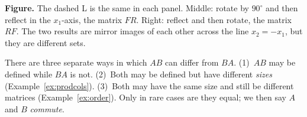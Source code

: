 \documentclass[11pt]{article}
\begin{document}
\begin{center}
\end{center}

\textbf{Figure.} The dashed L is the same in each panel. Middle: rotate by $90^\circ$ and then reflect in the $x_1$-axis, the matrix $FR$. Right: reflect and then rotate, the matrix $RF$. The two results are mirror images of each other across the line $x_2=-x_1$, but they are different sets.

There are three separate ways in which $AB$ can differ from $BA$. (1)~$AB$ may be defined while $BA$ is not. (2)~Both may be defined but have different \emph{sizes} (Example~\ref{ex:prodcols}). (3)~Both may have the same size and still be different matrices (Example~\ref{ex:order}). Only in rare cases are they equal; we then say $A$ and $B$ \emph{commute}.
\end{document}
